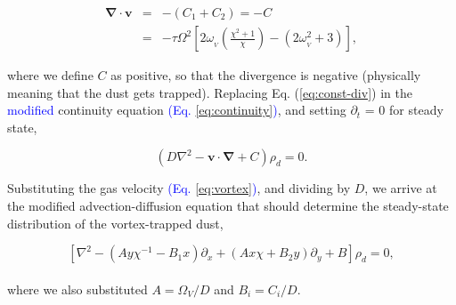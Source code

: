 \documentclass[apj]{emulateapj}
\renewcommand{\v}[1]{{\boldsymbol{#1}}} %
\def\blue#1{\textcolor{blue}{ #1}}
\newcommand{\del}{\v{\nabla}}
\newcommand{\Div}{\del\cdot}
\newcommand{\Laplace}{\nabla^2}
\newcommand{\Eq}[1]{Eq. (\ref{#1})}
\newcommand{\eq}[1]{\Eq{#1}}
\newcommand{\eqp}[1]{(Eq. \ref{#1})}
\newcommand{\beq}{\begin{equation}}
\newcommand{\eeq}{\end{equation}}
\newcommand{\beqn}{\begin{eqnarray}}
\newcommand{\eeqn}{\end{eqnarray}}
\begin{document}
\beqn
\Div{\v{v}} &=& -(C_1+C_2) = - C \label{eq:const-div}\\
&=& - \tau\varOmega^2
\left[2\omega_{_V}\left(\frac{\chi^2+1}{\chi}\right) - (2\omega_{_V}^2
  + 3) \right], 
\label{eq:scale-div}
\eeqn

\noindent where we define $C$ as positive, so that the divergence is
negative (physically meaning that the dust gets trapped). Replacing
\eq{eq:const-div} in the \blue{modified} continuity equation \blue{\eqp{eq:continuity}}, and setting $\partial_t$ =
0 for steady state, 

\beq
\left(D\Laplace{} -  \v{v}\cdot\del  + C\right)\rho_d = 0. 
\label{eq:steady}
\eeq

Substituting the gas velocity \blue{\eqp{eq:vortex}}, and dividing by $D$, we
arrive at the modified advection-diffusion equation that should
determine the steady-state distribution of the vortex-trapped dust, 

\beq
\left[\Laplace{} - \left(Ay\chi^{-1} - B_1x\right) \partial_x  +
  \left(A x \chi + B_2y\right) \partial_y + B \right] \rho_d   = 0,  
\label{eq:dust-trapping-cartesian}
\eeq
\\
\noindent where we also substituted  $A=\varOmega_V/D$ and $B_i=C_i/D$.
\end{document}
